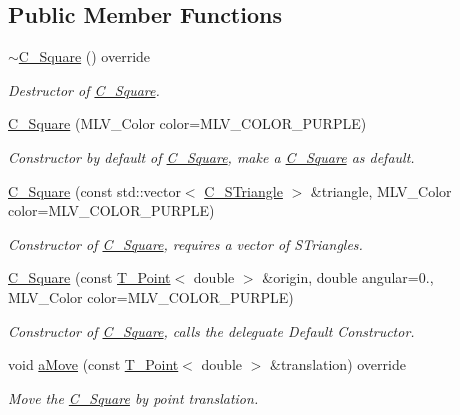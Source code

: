 \subsection*{Public Member Functions}
\begin{DoxyCompactItemize}
\item 
\hyperlink{classC__Square_a8b63c0c06cdda3835b85c4a38692ac44}{$\sim$\+C\+\_\+\+Square} () override
\begin{DoxyCompactList}\small\item\em Destructor of \hyperlink{classC__Square}{C\+\_\+\+Square}. \end{DoxyCompactList}\item 
\hyperlink{classC__Square_a3bec8a18c9b487b44585a38161cb6442}{C\+\_\+\+Square} (M\+L\+V\+\_\+\+Color color=M\+L\+V\+\_\+\+C\+O\+L\+O\+R\+\_\+\+P\+U\+R\+P\+LE)
\begin{DoxyCompactList}\small\item\em Constructor by default of \hyperlink{classC__Square}{C\+\_\+\+Square}, make a \hyperlink{classC__Square}{C\+\_\+\+Square} as default. \end{DoxyCompactList}\item 
\hyperlink{classC__Square_a6e100fed46e6b54971674c60a5f1d87b}{C\+\_\+\+Square} (const std\+::vector$<$ \hyperlink{classC__STriangle}{C\+\_\+\+S\+Triangle} $>$ \&triangle, M\+L\+V\+\_\+\+Color color=M\+L\+V\+\_\+\+C\+O\+L\+O\+R\+\_\+\+P\+U\+R\+P\+LE)
\begin{DoxyCompactList}\small\item\em Constructor of \hyperlink{classC__Square}{C\+\_\+\+Square}, requires a vector of S\+Triangles. \end{DoxyCompactList}\item 
\hyperlink{classC__Square_ac1c9c3504fff971ec8cdbec9f97b020b}{C\+\_\+\+Square} (const \hyperlink{classT__Point}{T\+\_\+\+Point}$<$ double $>$ \&origin, double angular=0., M\+L\+V\+\_\+\+Color color=M\+L\+V\+\_\+\+C\+O\+L\+O\+R\+\_\+\+P\+U\+R\+P\+LE)
\begin{DoxyCompactList}\small\item\em Constructor of \hyperlink{classC__Square}{C\+\_\+\+Square}, calls the deleguate Default Constructor. \end{DoxyCompactList}\item 
void \hyperlink{classC__Square_a6727523558c58dcd240ec080f254e7c9}{a\+Move} (const \hyperlink{classT__Point}{T\+\_\+\+Point}$<$ double $>$ \&translation) override
\begin{DoxyCompactList}\small\item\em Move the \hyperlink{classC__Square}{C\+\_\+\+Square} by point translation. \end{DoxyCompactList}\item 

\end{DoxyCompactItemize}
